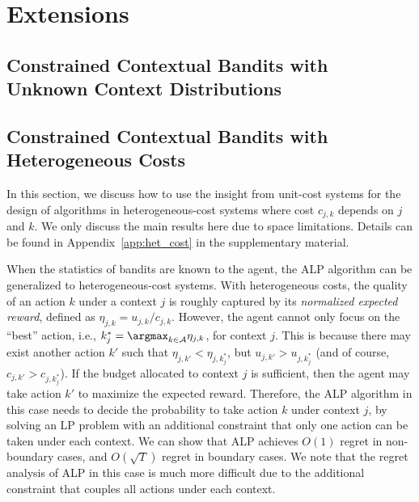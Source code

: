 \section{Extensions} \label{sec:exten}


\subsection{Constrained Contextual Bandits with Unknown Context Distributions} \label{subsec:unknown_dist}



\subsection{Constrained Contextual Bandits with Heterogeneous Costs} \label{subsec:het_cost}
{In this section, we discuss how to use the insight from unit-cost systems for the design of algorithms in heterogeneous-cost systems where cost $c_{j,k}$ depends on $j$ and $k$.
We only discuss the main results here due to space limitations. Details can be found in Appendix~\ref{app:het_cost} in the supplementary material.}

{When the statistics of bandits are known to the agent, the ALP algorithm can be generalized to heterogeneous-cost systems. With heterogeneous costs, the quality of an action $k$ under a context $j$ is roughly captured by its \emph{normalized expected reward}, defined as $\eta_{j,k} = u_{j,k}/c_{j,k}$. However, the agent cannot only focus on the ``best'' action, i.e., $k_j^* = \argmax_{k \in \mathcal{A}} \eta_{j,k}$, for context $j$.
This is because there may exist another action $k'$ such that $\eta_{j,k'} < \eta_{j,k_{j}^*}$, but $u_{j,k'} > u_{j,k_j^*}$ (and of course, $c_{j,k'} > c_{j, k_j^*}$). If the budget  allocated to context $j$ is sufficient, then the agent may take action $k'$ to maximize the expected reward. Therefore, the ALP algorithm in this case needs to decide the probability to take action $k$ under context $j$, by solving an LP problem with an additional constraint that only one action can be taken under each context.
We can show that  ALP achieves $O(1)$ regret in non-boundary cases, and $O(\sqrt{T})$ regret in boundary cases.
We note that the regret analysis of ALP in this case is much more difficult due to the additional constraint that couples all actions under each context. }

